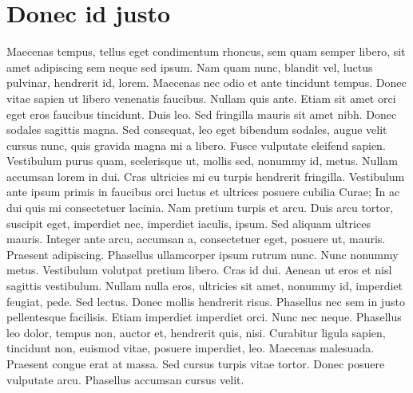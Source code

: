  \section{Donec id justo}
 Maecenas tempus, tellus eget condimentum rhoncus, sem quam semper libero, sit amet adipiscing sem neque sed ipsum. Nam quam nunc, blandit vel, luctus pulvinar, hendrerit id, lorem. Maecenas nec odio et ante tincidunt tempus. Donec vitae sapien ut libero venenatis faucibus. Nullam quis ante. Etiam sit amet orci eget eros faucibus tincidunt. Duis leo. Sed fringilla mauris sit amet nibh. Donec sodales sagittis magna. Sed consequat, leo eget bibendum sodales, augue velit cursus nunc, quis gravida magna mi a libero. Fusce vulputate eleifend sapien. Vestibulum purus quam, scelerisque ut, mollis sed, nonummy id, metus. Nullam accumsan lorem in dui. Cras ultricies mi eu turpis hendrerit fringilla. Vestibulum ante ipsum primis in faucibus orci luctus et ultrices posuere cubilia Curae; In ac dui quis mi consectetuer lacinia. Nam pretium turpis et arcu. Duis arcu tortor, suscipit eget, imperdiet nec, imperdiet iaculis, ipsum. Sed aliquam ultrices mauris. Integer ante arcu, accumsan a, consectetuer eget, posuere ut, mauris. Praesent adipiscing. Phasellus ullamcorper ipsum rutrum nunc. Nunc nonummy metus. Vestibulum volutpat pretium libero. Cras id dui. Aenean ut eros et nisl sagittis vestibulum. Nullam nulla eros, ultricies sit amet, nonummy id, imperdiet feugiat, pede. Sed lectus. Donec mollis hendrerit risus. Phasellus nec sem in justo pellentesque facilisis. Etiam imperdiet imperdiet orci. Nunc nec neque. Phasellus leo dolor, tempus non, auctor et, hendrerit quis, nisi. Curabitur ligula sapien, tincidunt non, euismod vitae, posuere imperdiet, leo. Maecenas malesuada. Praesent congue erat at massa. Sed cursus turpis vitae tortor. Donec posuere vulputate arcu. Phasellus accumsan cursus velit.


